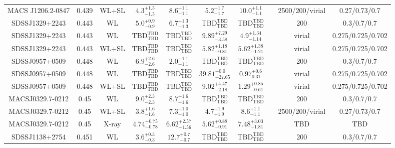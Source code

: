 \begin{table}
\begin{tabular}{cccccccccc}
MACS J1206.2-0847 & 0.439 & WL+SL & ${4.3}^{+1.5}_{-1.5}$ & ${8.6}^{+1.1}_{-1.1}$ & ${5.2}^{+1.7}_{-1.7}$ & ${10.0}^{+1.1}_{-1.1}$ & \citet{ME14.1} & 2500/200/virial & 0.27/0.73/0.7 \\
SDSSJ1329+2243 & 0.443 & WL & ${5.0}^{+0.9}_{-0.9}$ & ${6.7}^{+1.3}_{-1.3}$ & ${\mathrm{TBD}}^{\mathrm{TBD}}_{\mathrm{TBD}}$ & ${\mathrm{TBD}}^{\mathrm{TBD}}_{\mathrm{TBD}}$ & \citet{SE14.1} & 200 & 0.3/0.7/0.7 \\
SDSSJ1329+2243 & 0.443 & WL & ${\mathrm{TBD}}^{\mathrm{TBD}}_{\mathrm{TBD}}$ & ${\mathrm{TBD}}^{\mathrm{TBD}}_{\mathrm{TBD}}$ & ${9.89}^{+7.29}_{-3.58}$ & ${4.9}^{+1.34}_{-1.14}$ & \citet{OG12.1} & virial & 0.275/0.725/0.702 \\
SDSSJ1329+2243 & 0.443 & WL+SL & ${\mathrm{TBD}}^{\mathrm{TBD}}_{\mathrm{TBD}}$ & ${\mathrm{TBD}}^{\mathrm{TBD}}_{\mathrm{TBD}}$ & ${5.82}^{+1.18}_{-0.81}$ & ${5.62}^{+1.38}_{-1.21}$ & \citet{OG12.1} & virial & 0.275/0.725/0.702 \\
SDSSJ0957+0509 & 0.448 & WL & ${6.9}^{+2.6}_{-2.6}$ & ${2.0}^{+1.1}_{-1.1}$ & ${\mathrm{TBD}}^{\mathrm{TBD}}_{\mathrm{TBD}}$ & ${\mathrm{TBD}}^{\mathrm{TBD}}_{\mathrm{TBD}}$ & \citet{SE14.1} & 200 & 0.3/0.7/0.7 \\
SDSSJ0957+0509 & 0.448 & WL & ${\mathrm{TBD}}^{\mathrm{TBD}}_{\mathrm{TBD}}$ & ${\mathrm{TBD}}^{\mathrm{TBD}}_{\mathrm{TBD}}$ & ${39.81}^{+0.0}_{-27.65}$ & ${0.97}^{+0.6}_{0.31}$ & \citet{OG12.1} & virial & 0.275/0.725/0.702 \\
SDSSJ0957+0509 & 0.448 & WL+SL & ${\mathrm{TBD}}^{\mathrm{TBD}}_{\mathrm{TBD}}$ & ${\mathrm{TBD}}^{\mathrm{TBD}}_{\mathrm{TBD}}$ & ${9.02}^{+4.47}_{-2.18}$ & ${1.29}^{+0.85}_{-0.61}$ & \citet{OG12.1} & virial & 0.275/0.725/0.702 \\
MACSJ0329.7-0212 & 0.45 & WL & ${9.0}^{+2.3}_{-2.3}$ & ${8.7}^{+1.6}_{-1.6}$ & ${\mathrm{TBD}}^{\mathrm{TBD}}_{\mathrm{TBD}}$ & ${\mathrm{TBD}}^{\mathrm{TBD}}_{\mathrm{TBD}}$ & \citet{SE14.1} & 200 & 0.3/0.7/0.7 \\
MACSJ0329.7-0212 & 0.45 & WL+SL & ${3.8}^{+1.6}_{-1.6}$ & ${7.3}^{+1.0}_{-1.0}$ & ${4.7}^{+1.9}_{-1.9}$ & ${8.6}^{+1.1}_{-1.1}$ & \citet{ME14.1} & 2500/200/virial & 0.27/0.73/0.7 \\
MACSJ0329.7-0212 & 0.45 & X-ray & ${4.74}^{+0.75}_{-0.78}$ & ${6.62}^{+2.57}_{-1.56}$ & ${5.62}^{+0.88}_{-0.91}$ & ${7.48}^{+3.03}_{-1.81}$ & \citet{SC06.1} & TBD & TBD \\
SDSSJ1138+2754 & 0.451 & WL & ${3.6}^{+0.3}_{-0.3}$ & ${12.7}^{+0.7}_{-0.7}$ & ${\mathrm{TBD}}^{\mathrm{TBD}}_{\mathrm{TBD}}$ & ${\mathrm{TBD}}^{\mathrm{TBD}}_{\mathrm{TBD}}$ & \citet{SE14.1} & 200 & 0.3/0.7/0.7 \\

\end{tabular}
\end{table}
